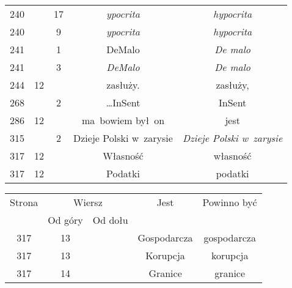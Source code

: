 \documentclass[a4paper,11pt]{article}
\begin{document}
\begin{center}
\begin{tabular}{|c|c|c|c|c|}
    240 & & 17 & \textit{ypocrita} & \textit{hypocrita} \\
    240 & & \hphantom{0}9 & \textit{ypocrita} & \textit{hypocrita} \\
    241 & & \hphantom{0}1 & DeMalo & \textit{De malo} \\
    241 & & \hphantom{0}3 & \textit{DeMalo} & \textit{De malo} \\
    244 & 12 & & zasłuży. & zasłuży, \\
    268 & & \hphantom{0}2 & \ldots InSent & InSent \\
    286 & 12 & & ma~bowiem był~on & jest \\
    315 & & \hphantom{0}2 & Dzieje Polski w~zarysie
    & \textit{Dzieje Polski w~zarysie} \\
    317 & 12 & & Własność & własność \\
    317 & 12 & & Podatki & podatki \\
    \hline
  \end{tabular}





  \newpage

  \begin{tabular}{|c|c|c|c|c|}
    \hline
    Strona & \multicolumn{2}{c|}{Wiersz} & Jest
                              & Powinno być \\ \cline{2-3}
    & Od góry & Od dołu & & \\
    \hline
    317 & 13 & & Gospodarcza & gospodarcza \\
    317 & 13 & & Korupcja & korupcja \\
    317 & 14 & & Granice & granice \\
    \hline
  \end{tabular}

\end{center}

\vspace{\spaceTwo}













\newpage

\end{document}
